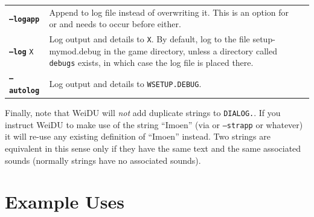\documentclass{article}
\def\ttref#1{\ahrefloc{#1}{\tt #1}}
\def\DEFINE#1{{\tt \bf #1}\label{#1}\index{#1}}
\def\t#1{{\tt #1}}
\begin{document}
\begin{tabular}{lp{10in}|p{10in}}
\DEFINE{--logapp} & Append to log file instead of overwriting it. This
is an option for \ttref{--log} or \ttref{--autolog} and needs to occur
before either. \\
\DEFINE{--log} \t{X}& Log output and details to \t{X}. By default, log
to the file setup-mymod.debug in the game directory, unless a
directory called \t{debugs} exists, in which case the log file is
placed there. \\

\DEFINE{--autolog} & 	Log output and details to \t{WSETUP.DEBUG}. \\
\end{tabular}

Finally, note that WeiDU will \emph{not} add duplicate strings to
\t{DIALOG.}\ttref{TLK}. If you instruct WeiDU to make use of the string
``Imoen'' (via \ttref{SAY} or \t{--strapp} or whatever) it will re-use any
existing definition of ``Imoen'' instead. Two strings are equivalent in
this sense only if they have the same text and the same associated sounds
(normally strings have no associated sounds).

\section{Example Uses}
\end{document}
